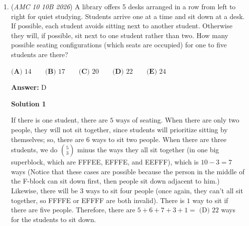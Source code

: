 \begin{enumerate}
 



\textbf{Solution 5}

Notice the number on the end of every set, they all have a difference of $3$, and we start at $1$, so by doing 
 \[\frac{2026-1}{3} ~= 675\] but that is just an estimate, so we have to compensate it by adding an $1$, so the answer is $676$, and by adding their digits, we get $6+7+6 = \boxed{\textbf{(D) }19}$.

 



\textbf{Solution 6}

$1, 2, 3$ are in the sequence $3$ times. $4, 5, 6$ are in the sequence $2$ times. In general, $x$ is in the sequence $\lceil x \rceil$ times. So $2026$ is in the sequence $\lceil 2026 \rceil$ times = $676$. So $N = 6+7+6=\fbox{19}$Note: $\lceil x \rceil$] means taking $\frac{x}{3}$ and rounding it up to the next integer

 


	\item (\textit{AMC 10 10B 2026}) A library offers 5 desks arranged in a row from left to right for quiet studying. Students arrive
one at a time and sit down at a desk. If possible, each student avoids sitting next to another
student. Otherwise they will, if possible, sit next to one student rather than two. How many
possible seating configurations (which seats are occupied) for one to five students are there?


 $\textbf{(A) } 14 \qquad \textbf{(B) } 17 \qquad \textbf{(C) } 20 \qquad \textbf{(D) } 22 \qquad \textbf{(E) } 24$

 \textbf{Answer: }D



\textbf{Solution 1}

If there is one student, there are $5$ ways of seating. When there are only two people, they will not sit together, since students will prioritize sitting by themselves; so, there are $6$ ways to sit two people. When there are three students, we do $\binom{5}{3}$ minus the ways they all sit together (in one big superblock, which are FFFEE, EFFFE, and EEFFF), which is $10 - 3 = 7$ ways (Notice that these cases are possible because the person in the middle of the F-block can sit down first, then people sit down adjacent to him.) Likewise, there will be $3$ ways to sit four people (once again, they can't all sit together, so FFFFE or EFFFF are both invalid). There is $1$ way to sit if there are five people. Therefore, there are $5+6+7+3+1=$ $\boxed{\text{(D) }{22}}$ ways for the students to sit down.


\end{enumerate}
